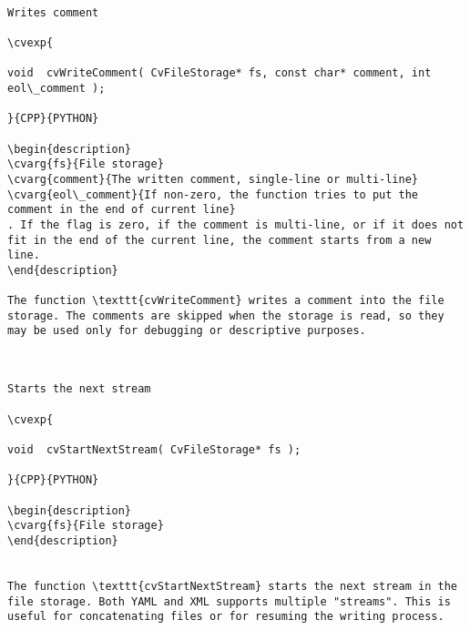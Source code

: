 \begin{verbatim}

Writes comment

\cvexp{

void  cvWriteComment( CvFileStorage* fs, const char* comment, int eol\_comment );

}{CPP}{PYTHON}

\begin{description}
\cvarg{fs}{File storage}
\cvarg{comment}{The written comment, single-line or multi-line}
\cvarg{eol\_comment}{If non-zero, the function tries to put the comment in the end of current line}
. If the flag is zero, if the comment is multi-line, or if it does not fit in the end of the current line, the comment starts from a new line.
\end{description}

The function \texttt{cvWriteComment} writes a comment into the file storage. The comments are skipped when the storage is read, so they may be used only for debugging or descriptive purposes.


\end{verbatim}
\begin{verbatim}

Starts the next stream

\cvexp{

void  cvStartNextStream( CvFileStorage* fs );

}{CPP}{PYTHON}

\begin{description}
\cvarg{fs}{File storage}
\end{description}


The function \texttt{cvStartNextStream} starts the next stream in the file storage. Both YAML and XML supports multiple "streams". This is useful for concatenating files or for resuming the writing process.


\end{verbatim}
